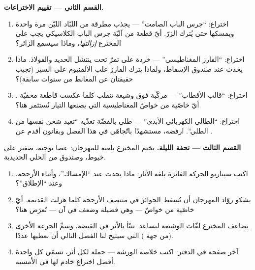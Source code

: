 \begin{problem}
\medskip\noindent\textbf{القسم الثاني --- تقييم الاختراعات.}
\begin{enumerate}[resume]
  \item اختراع: ``جرس الباب الصامت'' ---  يجذب
        مطرقة من اللبّاد الليّن مرة واحدة ويمسكها حتى يُترك
        الزرّ. أيّ قطعة من آليّة جرس الباب الكلاسيكي يجب على
        المخترع \emph{إزالتها}، وماذا سيسمع الزائر؟
  \item اختراع: ``الفارز المغناطيسي'' --- خردة على  تمرّ
        تحت  ينتشل الحديد والفولاذ. ماذا يحدث
        عند صندوق الإسقاط، ولماذا يترك الفارز علب الألمنيوم
        على السير (تجيب حقيقتان عن المغانط من سنوات سابقة)؟
  \item اختراع: ``قالب الأقطاب'' ---  مركّبة فوق وشيعة
        تنقلب كلما عكست قاطعة مخفيّة . أيّ خاصّية من
        خواصّ المغناطيسية التي يصنعها التيار تُستثمر هنا؟
  \item اختراع: ``الطالي الكهربائي الأبدي'' --- طلي بالفضّة
        تغذّيه  ``تعيد شحن نفسها من الطلي''. ارفضه،
        مستشهدًا باتّجاهَي  في هذا الفصل وبقانون أقدم
        عن .
\end{enumerate}

\medskip\noindent\textbf{القسم الثالث --- تحفة الليلة.}
يختم المخترع بلعبة  للمهرجان: عصا توجيه، 
صغير على خيوط، وصندوق من الحلي الحديدية.
\begin{enumerate}[resume]
  \item اكتب سيناريو الحركة الفائزة بلغة الآثار: ماذا يحدث
        عند ``الإمساك''، وأثناء الأرجحة، وعند ``الإطلاق''؟
  \item يشكو روّاد المهرجان أن  تُسقط الجوائز في منتصف
        الأرجحة كلما هزلت  القديمة. أيّ خاصّية من
        خواصّ  --- وهي فضيلة وضعف في آن ---
        تُعرَض هنا؟
  \item يضاعف المخترع لفّات الوشيعة ليساعد. تنبّأ بالأثر في
        القبضة، وسمِّ الجرعة الأخرى (من جهة ) التي
        سيتيح لنا الفصل التالي أن نعطيها عددًا.
  \item آخر صفحة في الدفتر: اكتب خلاصة الورشة --- جملة لكل
        أثر، تسمّي كل واحدة أفضل اختراع خادم لها في الأمسية.
\end{enumerate}
\end{problem}
